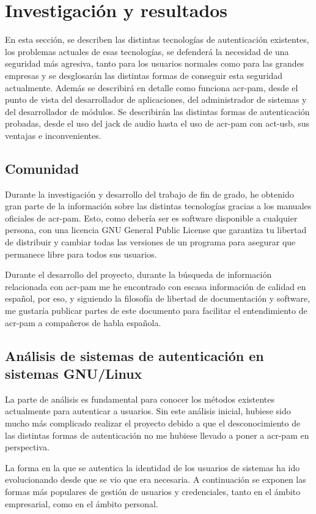 \documentclass[titlepage, 12pt, a4paper]{article}
\begin{document}
\section{Investigación y resultados}
En esta sección, se describen las distintas tecnologías de autenticación existentes, los problemas actuales de esas tecnologías, se defenderá la necesidad de una seguridad más agresiva, tanto para los usuarios normales como para las grandes empresas y se desglosarán las distintas formas de conseguir esta seguridad actualmente. Además se describirá en detalle como funciona \gls{acr-pam}, desde el punto de vista del desarrollador de aplicaciones, del administrador de sistemas y del desarrollador de módulos. Se describirán las distintas formas de autenticación probadas, desde el uso del jack de audio hasta el uso de \gls{acr-pam} con \gls{act-usb}, sus ventajas e inconvenientes.
\subsection{Comunidad}
Durante la investigación y desarrollo del trabajo de fin de grado, he obtenido gran parte de la información sobre las distintas tecnologías gracias a los manuales oficiales de \gls{acr-pam}. Esto, como debería ser es software disponible a cualquier persona, con una licencia GNU General Public License que garantiza tu libertad de distribuir y cambiar todas las versiones de un programa para asegurar que permanece libre para todos sus usuarios. \cite{GNU-GPL} \par
Durante el desarrollo del proyecto, durante la búsqueda de información relacionada con \gls{acr-pam} me he encontrado con escasa información de calidad en español, por eso, y siguiendo la filosofía de libertad de documentación y software, me gustaría publicar partes de este documento para facilitar el entendimiento de \gls{acr-pam} a compañeros de habla española.
\subsection{Análisis de sistemas de autenticación en sistemas \gls{GNU/Linux}}
La parte de análisis es fundamental para conocer los métodos existentes actualmente para autenticar a usuarios. Sin este análisis inicial, hubiese sido mucho más complicado realizar el proyecto debido a que el desconocimiento de las distintas formas de autenticación no me hubiese llevado a poner a \gls{acr-pam} en perspectiva. \par
La forma en la que se autentica la identidad de los usuarios de sistemas ha ido evolucionando desde que se vio que era necesaria. A continuación se exponen las formas más populares de gestión de usuarios y credenciales, tanto en el ámbito empresarial, como en el ámbito personal.
\end{document}
